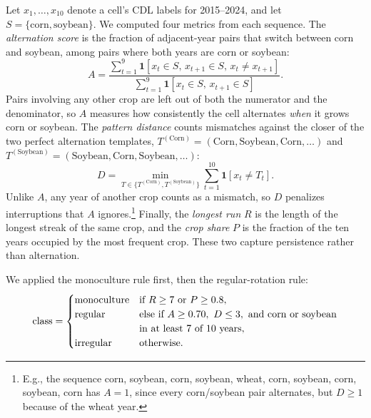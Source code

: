 \documentclass[10pt,letterpaper]{article}
\begin{document}
Let $x_1,\ldots,x_{10}$ denote a cell's CDL labels for 2015--2024, and let $S=\{\text{corn},\text{soybean}\}$. We computed four metrics from each sequence. The \emph{alternation score} is the fraction of adjacent-year pairs that switch between corn and soybean, among pairs where both years are corn or soybean:
\begin{equation}
A=\frac{\sum_{t=1}^{9}\mathbf{1}[x_t\in S,\,x_{t+1}\in S,\,x_t\ne x_{t+1}]}{\sum_{t=1}^{9}\mathbf{1}[x_t\in S,\,x_{t+1}\in S]}.
\label{eq:alternation}
\end{equation}
Pairs involving any other crop are left out of both the numerator and the denominator, so $A$ measures how consistently the cell alternates \emph{when} it grows corn or soybean. The \emph{pattern distance} counts mismatches against the closer of the two perfect alternation templates, $T^{(\mathrm{Corn})}=(\mathrm{Corn},\mathrm{Soybean},\mathrm{Corn},\ldots)$ and $T^{(\mathrm{Soybean})}=(\mathrm{Soybean},\mathrm{Corn},\mathrm{Soybean},\ldots)$:
\begin{equation}
D=\min_{T\in\{T^{(\mathrm{Corn})},T^{(\mathrm{Soybean})}\}}\sum_{t=1}^{10}\mathbf{1}[x_t\ne T_t].
\label{eq:distance}
\end{equation}
Unlike $A$, any year of another crop counts as a mismatch, so $D$ penalizes interruptions that $A$ ignores.\footnote{E.g., the sequence corn, soybean, corn, soybean, wheat, corn, soybean, corn, soybean, corn has $A=1$, since every corn/soybean pair alternates, but $D\geq1$ because of the wheat year.}
Finally, the \emph{longest run} $R$ is the length of the longest streak of the same crop, and the \emph{crop share} $P$ is the fraction of the ten years occupied by the most frequent crop. These two capture persistence rather than alternation.

We applied the monoculture rule first, then the regular-rotation rule:
\begin{equation}
\mathrm{class}=\begin{cases}
\text{monoculture} & \text{if }R\geq7\text{ or }P\geq0.8,\\
\text{regular} & \begin{array}[t]{@{}l@{}}\text{else if }A\geq0.70,\ D\leq3,\text{ and corn or soybean}\\\text{in at least 7 of 10 years},\end{array}\\
\text{irregular} & \text{otherwise.}
\end{cases}
\label{eq:rule}
\end{equation}
\end{document}
